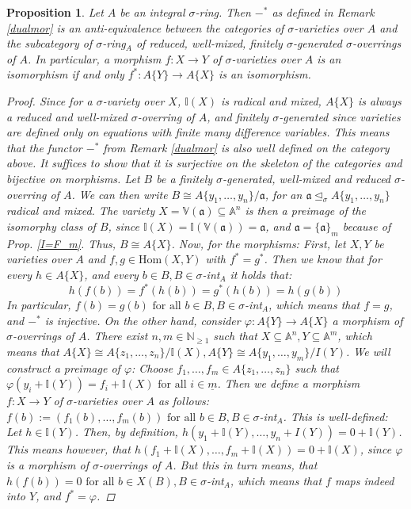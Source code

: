 \documentclass{article}
\def\I{\mathbb{I}}
\def\NE{\mathbb{N}_{\geq1}}
\def\VV{\mathbb{V}}
\def\a{\mathfrak{a}}
\def\s{\sigma}
\def\si{\unlhd_{\sigma}}
\def\Hom{\text{Hom}}
\def\fa{\text{ for all }}
\newenvironment{bew}{\begin{proof}[Proof]}{\end{proof}}
\theoremstyle{plain}
\newtheorem{prop}[Satz]{Proposition}
\theoremstyle{definition}
\begin{document}
\begin{prop}\label{dualisequiv}
Let $A$ be an integral $\s$-ring. Then $-^*$ as defined in Remark \ref{dualmor} is an anti-equivalence between the categories of $\s$-varieties over $A$ and the subcategory of $\s$-ring$_A$ of reduced, well-mixed, finitely $\s$-generated $\s$-overrings of $A$. 
In particular, a morphism $f: X \rightarrow Y$ of $\s$-varieties over $A$ is an isomorphism if and only $f^*: A\{Y\} \rightarrow A\{X\}$ is an isomorphism.
\begin{bew}
Since for a $\s$-variety over $X$, $\I(X)$ is radical and mixed, $A\{X\}$ is always a reduced and well-mixed $\s$-overring of $A$, 
and finitely $\s$-generated since varieties are defined only on equations with finite many difference variables. This means that the functor $-^*$ from Remark \ref{dualmor} is also well defined on the category above.
It suffices to show that it is surjective on the skeleton of the categories and bijective on morphisms. 
Let $B$ be a finitely $\s$-generated, well-mixed and reduced $\s$-overring of $A$. We can then write $B \cong A\{y_1,\ldots,y_n\}/\a$, for an $\a \si A\{y_1,\ldots,y_n\}$ radical and mixed. The variety $X = \VV(\a) \subseteq \mathbb{A}^n$
is then a preimage of the isomorphy class of $B$, since $\I(X) = \I(\VV(\a)) = \a$, and $\a = \{ \a \}_m$ because of Prop. \ref{I=F_m}. Thus, $B \cong A\{X\}$.
Now, for the morphisms: First, let $X,Y$ be varieties over $A$ and $f,g \in \Hom(X,Y)$ with $f^* = g^*$. Then we know that for every $h \in A\{X\}$, and every $b \in B, B \in \s$-int$_A$ it holds that:
\[ h(f(b)) = f^*(h(b)) = g^*(h(b)) = h(g(b)) \]
In particular, $f(b) = g(b) \fa b \in B, B \in \s$-int$_A$, which means that $f = g$, and $-^*$ is injective. 
On the other hand, consider $\varphi: A\{Y\} \rightarrow A\{X\}$ a morphism of $\s$-overrings of $A$. There exist $n,m \in \NE$ such that $X \subseteq \mathbb{A}^n, Y \subseteq \mathbb{A}^m$,
 which means that $A\{X\} \cong A\{z_1,\ldots,z_n\}/\I(X), A\{Y\} \cong A\{y_1,\ldots,y_m\}/I(Y)$. We will construct a preimage of $\varphi$: Choose $f_1,\ldots,f_m \in A\{z_1,\ldots,z_n\}$ such that $\varphi(y_i + \I(Y)) = f_i + \I(X) \fa i \in \underline{m}$.
Then we define a morphism $f: X \rightarrow Y$ of $\s$-varieties over $A$ as follows: $f(b) := (f_1(b),\ldots,f_m(b)) \fa b \in B, B \in \s$-int$_A$. This is well-defined: Let $h \in \I(Y)$. Then, by definition, $h(y_1 + \I(Y),\ldots,y_n + I(Y)) = 0 + \I(Y)$.
This means however, that $h(f_1 + \I(X),\ldots,f_m + \I(X)) = 0 + \I(X)$, since $\varphi$ is a morphism of $\s$-overrings of $A$. But this in turn means, that $h(f(b)) = 0 \fa b \in X(B), B \in \s$-int$_A$, which means that $f$ maps indeed into $Y$, and $f^* = \varphi$.
\end{bew}
\end{prop}
\end{document}

